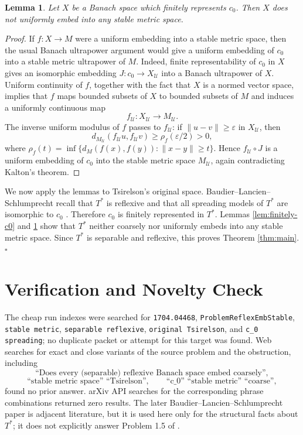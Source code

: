 \documentclass[11pt]{article}
\newtheorem{lemma}{Lemma}
\begin{document}
\begin{lemma}\label{lem:uniform}
Let \(X\) be a Banach space which finitely represents \(c_0\).  Then \(X\) does
not uniformly embed into any stable metric space.
\end{lemma}

\begin{proof}
If \(f:X\to M\) were a uniform embedding into a stable metric space, then the
usual Banach ultrapower argument would give a uniform embedding of \(c_0\) into
a stable metric ultrapower of \(M\).  Indeed, finite representability of \(c_0\)
in \(X\) gives an isomorphic embedding \(J:c_0\to X_{\mathcal U}\) into a
Banach ultrapower of \(X\).  Uniform continuity of \(f\), together with the fact
that \(X\) is a normed vector space, implies that \(f\) maps bounded subsets of
\(X\) to bounded subsets of \(M\) and induces a uniformly continuous map
\[
  f_{\mathcal U}:X_{\mathcal U}\to M_{\mathcal U}.
\]
The inverse uniform modulus of \(f\) passes to \(f_{\mathcal U}\): if
\(\|u-v\|\ge\varepsilon\) in \(X_{\mathcal U}\), then
\[
  d_{M_{\mathcal U}}(f_{\mathcal U}u,f_{\mathcal U}v)
  \ge \rho_f(\varepsilon/2)>0,
\]
where \(\rho_f(t)=\inf\{d_M(f(x),f(y)):\|x-y\|\ge t\}\).  Hence
\(f_{\mathcal U}\circ J\) is a uniform embedding of \(c_0\) into the stable
metric space \(M_{\mathcal U}\), again contradicting Kalton's theorem.
\end{proof}

We now apply the lemmas to Tsirelson's original space.  Baudier--Lancien--
Schlumprecht recall that \(T^*\) is reflexive and that all spreading models of
\(T^*\) are isomorphic to \(c_0\) \cite[p. 18]{BLS}.  Therefore \(c_0\) is
finitely represented in \(T^*\).  Lemmas \ref{lem:finitely-c0} and
\ref{lem:uniform} show that \(T^*\) neither coarsely nor uniformly embeds into
any stable metric space.  Since \(T^*\) is separable and reflexive, this proves
Theorem \ref{thm:main}. \(\square\)

\section*{Verification and Novelty Check}

The cheap run indexes were searched for \texttt{1704.04468},
\texttt{ProblemReflexEmbStable}, \texttt{stable metric},
\texttt{separable reflexive}, \texttt{original Tsirelson}, and
\texttt{c\_0 spreading}; no duplicate packet or attempt for this target was
found.  Web searches for exact and close variants of the source problem and
the obstruction, including
\[
\text{``Does every (separable) reflexive Banach space embed coarsely''},
\]
\[
\text{``stable metric space'' ``Tsirelson''},\qquad
\text{``c\_0'' ``stable metric'' ``coarse''},
\]
found no prior answer.  arXiv API searches for the corresponding phrase
combinations returned zero results.  The later Baudier--Lancien--Schlumprecht
paper is adjacent literature, but it is used here only for the structural facts
about \(T^*\); it does not explicitly answer Problem 1.5 of \cite{BragaSwift}.
\end{document}
